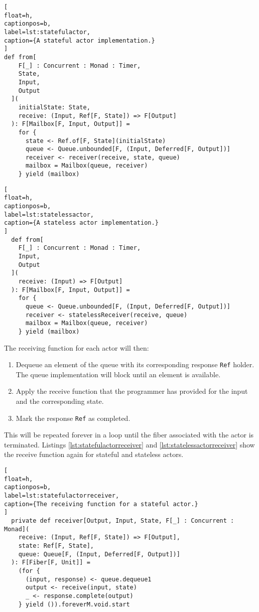 \documentclass[../main.tex]{subfiles}
\begin{document}
\begin{lstlisting}[
float=h,
captionpos=b,
label=lst:statefulactor,
caption={A stateful actor implementation.}
]
def from[
    F[_] : Concurrent : Monad : Timer,
    State,
    Input,
    Output
  ](
    initialState: State,
    receive: (Input, Ref[F, State]) => F[Output]
  ): F[Mailbox[F, Input, Output]] =
    for {
      state <- Ref.of[F, State](initialState)
      queue <- Queue.unbounded[F, (Input, Deferred[F, Output])]
      receiver <- receiver(receive, state, queue)
      mailbox = Mailbox(queue, receiver)
    } yield (mailbox)
\end{lstlisting}

\begin{lstlisting}[
float=h,
captionpos=b,
label=lst:statelessactor,
caption={A stateless actor implementation.}
]
  def from[
    F[_] : Concurrent : Monad : Timer,
    Input,
    Output
  ](
    receive: (Input) => F[Output]
  ): F[Mailbox[F, Input, Output]] =
    for {
      queue <- Queue.unbounded[F, (Input, Deferred[F, Output])]
      receiver <- statelessReceiver(receive, queue)
      mailbox = Mailbox(queue, receiver)
    } yield (mailbox)
\end{lstlisting}

The receiving function for each actor will then:

\begin{enumerate}
\item Dequeue an element of the queue with its corresponding response
  \texttt{Ref} holder. The queue implementation will block until an element is
  available.
\item Apply the receive function that the programmer has provided for the input
  and the corresponding state.
\item Mark the response \texttt{Ref} as completed.
\end{enumerate}

This will be repeated forever in a loop until the fiber associated with the
actor is terminated. Listings \ref{lst:statefulactorreceiver} and
\ref{lst:statelessactorreceiver} show the receive function again for stateful
and stateless actors.

\begin{lstlisting}[
float=h,
captionpos=b,
label=lst:statefulactorreceiver,
caption={The receiving function for a stateful actor.}
]
  private def receiver[Output, Input, State, F[_] : Concurrent : Monad](
    receive: (Input, Ref[F, State]) => F[Output],
    state: Ref[F, State],
    queue: Queue[F, (Input, Deferred[F, Output])]
  ): F[Fiber[F, Unit]] =
    (for {
      (input, response) <- queue.dequeue1
      output <- receive(input, state)
      _ <- response.complete(output)
    } yield ()).foreverM.void.start
\end{lstlisting}
\end{document}
